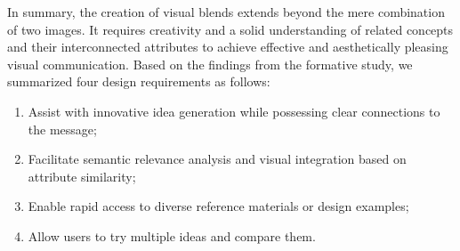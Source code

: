 In summary, the creation of visual blends extends beyond the mere combination of two images. It requires creativity and a solid understanding of related concepts and their interconnected attributes to achieve effective and aesthetically pleasing visual communication.
Based on the findings from the formative study, we summarized four design requirements as follows:
\begin{enumerate}[leftmargin=*, label=\textbf{R\arabic*}]
    \item Assist with innovative idea generation while possessing clear connections to the message;
    \item Facilitate semantic relevance analysis and visual integration based on attribute similarity;
    \item Enable rapid access to diverse reference materials or design examples; 
    \item Allow users to try multiple ideas and compare them.
\end{enumerate}

